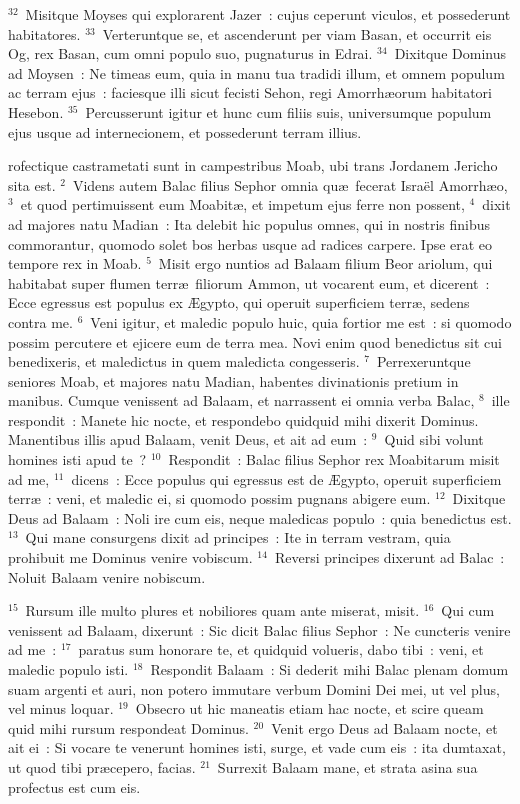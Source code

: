 ${}^{32}$~Misitque Moyses qui explorarent Jazer~: cujus ceperunt viculos, et possederunt habitatores.
${}^{33}$~Verteruntque se, et ascenderunt per viam Basan, et occurrit eis Og, rex Basan, cum omni populo suo, pugnaturus in Edrai.
${}^{34}$~Dixitque Dominus ad Moysen~: Ne timeas eum, quia in manu tua tradidi illum, et omnem populum ac terram ejus~: faciesque illi sicut fecisti Sehon, regi Amorrh\ae orum habitatori Hesebon.
${}^{35}$~Percusserunt igitur et hunc cum filiis suis, universumque populum ejus usque ad internecionem, et possederunt terram illius.

\bchapter
{}rofectique castrametati sunt in campestribus Moab, ubi trans Jordanem Jericho sita est.
${}^{2}$~Videns autem Balac filius Sephor omnia qu\ae\ fecerat Isra\"el Amorrh\ae o,
${}^{3}$~et quod pertimuissent eum Moabit\ae , et impetum ejus ferre non possent,
${}^{4}$~dixit ad majores natu Madian~: Ita delebit hic populus omnes, qui in nostris finibus commorantur, quomodo solet bos herbas usque ad radices carpere. Ipse erat eo tempore rex in Moab.
${}^{5}$~Misit ergo nuntios ad Balaam filium Beor ariolum, qui habitabat super flumen terr\ae\ filiorum Ammon, ut vocarent eum, et dicerent~: Ecce egressus est populus ex \AE gypto, qui operuit superficiem terr\ae , sedens contra me.
${}^{6}$~Veni igitur, et maledic populo huic, quia fortior me est~: si quomodo possim percutere et ejicere eum de terra mea. Novi enim quod benedictus sit cui benedixeris, et maledictus in quem maledicta congesseris.
${}^{7}$~Perrexeruntque seniores Moab, et majores natu Madian, habentes divinationis pretium in manibus. Cumque venissent ad Balaam, et narrassent ei omnia verba Balac,
${}^{8}$~ille respondit~: Manete hic nocte, et respondebo quidquid mihi dixerit Dominus. Manentibus illis apud Balaam, venit Deus, et ait ad eum~:
${}^{9}$~Quid sibi volunt homines isti apud te~?
${}^{10}$~Respondit~: Balac filius Sephor rex Moabitarum misit ad me,
${}^{11}$~dicens~: Ecce populus qui egressus est de \AE gypto, operuit superficiem terr\ae~: veni, et maledic ei, si quomodo possim pugnans abigere eum.
${}^{12}$~Dixitque Deus ad Balaam~: Noli ire cum eis, neque maledicas populo~: quia benedictus est.
${}^{13}$~Qui mane consurgens dixit ad principes~: Ite in terram vestram, quia prohibuit me Dominus venire vobiscum.
${}^{14}$~Reversi principes dixerunt ad Balac~: Noluit Balaam venire nobiscum.


${}^{15}$~Rursum ille multo plures et nobiliores quam ante miserat, misit.
${}^{16}$~Qui cum venissent ad Balaam, dixerunt~: Sic dicit Balac filius Sephor~: Ne cuncteris venire ad me~:
${}^{17}$~paratus sum honorare te, et quidquid volueris, dabo tibi~: veni, et maledic populo isti.
${}^{18}$~Respondit Balaam~: Si dederit mihi Balac plenam domum suam argenti et auri, non potero immutare verbum Domini Dei mei, ut vel plus, vel minus loquar.
${}^{19}$~Obsecro ut hic maneatis etiam hac nocte, et scire queam quid mihi rursum respondeat Dominus.
${}^{20}$~Venit ergo Deus ad Balaam nocte, et ait ei~: Si vocare te venerunt homines isti, surge, et vade cum eis~: ita dumtaxat, ut quod tibi pr\ae cepero, facias.
${}^{21}$~Surrexit Balaam mane, et strata asina sua profectus est cum eis.


